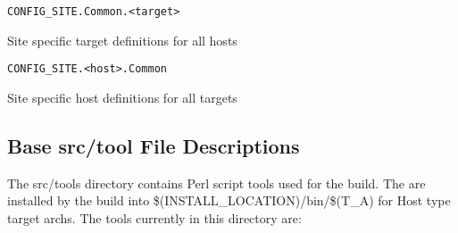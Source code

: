 \begin{description}
\end{description}\begin{verbatim}CONFIG_SITE.Common.<target>
\end{verbatim}\begin{description}\item Site specific target definitions for all hosts

\end{description}\begin{verbatim}CONFIG_SITE.<host>.Common
\end{verbatim}\begin{description}\item Site specific host definitions for all targets

\end{description}\subsection{Base src/tool File Descriptions}

The src/tools directory contains Perl script tools used for the build. The are installed by the build into 
\$(INSTALL\_LOCATION)/bin/\$(T\_A) for Host type target archs. The tools currently in this directory are:

